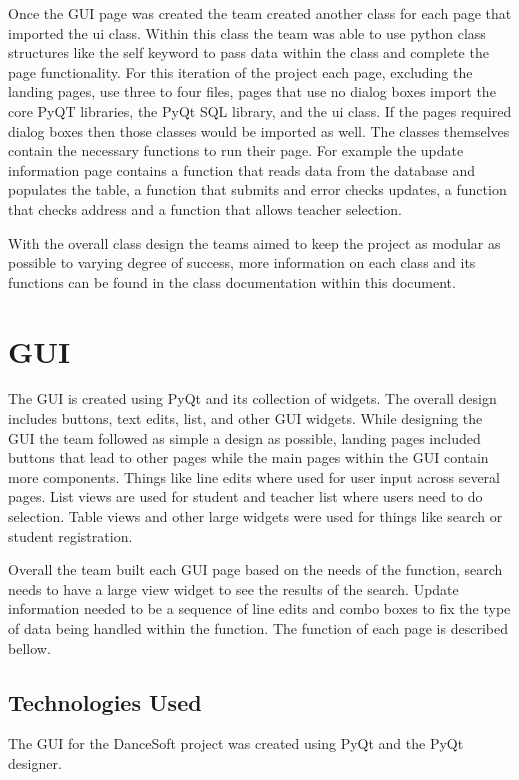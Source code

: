 Once the GUI page was created the team created another class for each page that imported the ui class. Within this class the team was able to use python class structures like the self keyword to pass data within the class and complete the page functionality. For this iteration of the project each page, excluding the landing pages, use three to four files, pages that use no dialog boxes import the core PyQT libraries, the PyQt SQL library, and the ui class. If the pages required dialog boxes then those classes would be imported as well. The classes themselves contain the necessary functions to run their page. For example the update information page contains a function that reads data from the database and populates the table, a function that submits and error checks updates, a function that checks address and a function that allows teacher selection.

With the overall class design the teams aimed to keep the project as modular as possible to varying degree of success, more information on each class and its functions can be found in the class documentation within this document.
 

\section{GUI}
The GUI is created using PyQt and its collection of widgets. The overall design includes buttons, text edits, list, and other GUI widgets. While designing the GUI the team followed as simple a design as possible, landing pages included buttons that lead to other pages while the main pages within the GUI contain more components. Things like line edits where used for user input across several pages. List views are used for student and teacher list where users need to do selection. Table views and other large widgets were used for things like search or student registration.

Overall the team built each GUI page based on the needs of the function, search needs to have a large view widget to see the results of the search. Update information needed to be a sequence of line edits and combo boxes to fix the type of data being handled within the function. The function of each page is described bellow.

\subsection{Technologies  Used}
The GUI for the DanceSoft project was created using PyQt and the PyQt designer. 


